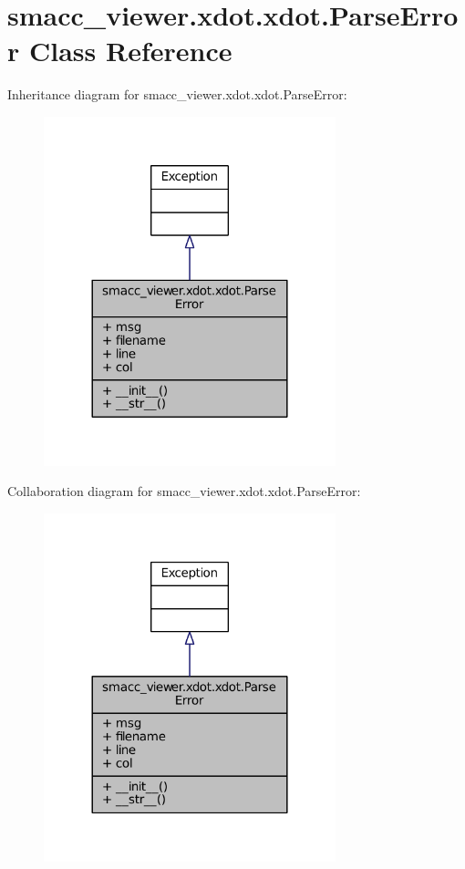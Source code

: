 \hypertarget{classsmacc__viewer_1_1xdot_1_1xdot_1_1ParseError}{}\section{smacc\+\_\+viewer.\+xdot.\+xdot.\+Parse\+Error Class Reference}
\label{classsmacc__viewer_1_1xdot_1_1xdot_1_1ParseError}


Inheritance diagram for smacc\+\_\+viewer.\+xdot.\+xdot.\+Parse\+Error\+:
\nopagebreak
\begin{figure}[H]
\begin{center}
\leavevmode
\includegraphics[width=240pt]{classsmacc__viewer_1_1xdot_1_1xdot_1_1ParseError__inherit__graph}
\end{center}
\end{figure}


Collaboration diagram for smacc\+\_\+viewer.\+xdot.\+xdot.\+Parse\+Error\+:
\nopagebreak
\begin{figure}[H]
\begin{center}
\leavevmode
\includegraphics[width=240pt]{classsmacc__viewer_1_1xdot_1_1xdot_1_1ParseError__coll__graph}
\end{center}
\end{figure}
